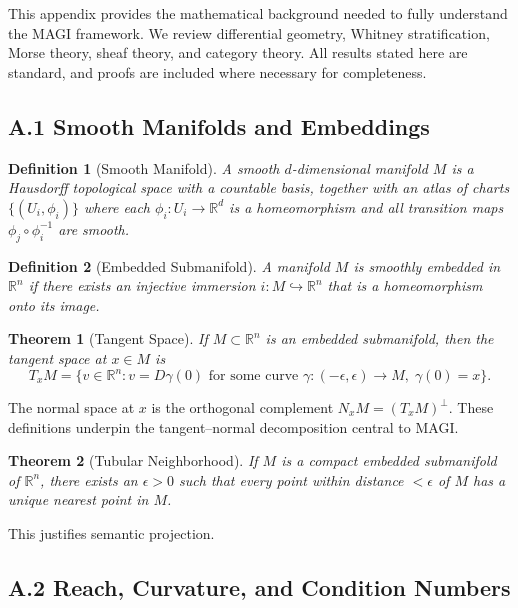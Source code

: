 \documentclass[11pt,a4paper,twocolumn]{article}
\newtheorem*{theorem*}{Theorem}
\newtheorem*{definition*}{Definition}
\begin{document}
This appendix provides the mathematical background needed to fully
understand the MAGI framework. We review differential geometry,
Whitney stratification, Morse theory, sheaf theory, and category theory.
All results stated here are standard, and proofs are included where
necessary for completeness.

\subsection*{A.1 Smooth Manifolds and Embeddings}

\begin{definition*}[Smooth Manifold]
A smooth $d$-dimensional manifold $M$ is a Hausdorff topological space
with a countable basis, together with an atlas of charts
$\{(U_i,\phi_i)\}$ where each $\phi_i : U_i \to \mathbb{R}^d$ is a
homeomorphism and all transition maps $\phi_j \circ \phi_i^{-1}$ are
smooth.
\end{definition*}

\begin{definition*}[Embedded Submanifold]
A manifold $M$ is smoothly embedded in $\mathbb{R}^n$ if there exists an
injective immersion $i : M \hookrightarrow \mathbb{R}^n$ that is a
homeomorphism onto its image.
\end{definition*}

\begin{theorem*}[Tangent Space]
If $M \subset \mathbb{R}^n$ is an embedded submanifold, then the tangent
space at $x \in M$ is
\[
T_x M = \{v \in \mathbb{R}^n : v = D\gamma(0) \text{ for some curve }
\gamma : (-\epsilon,\epsilon) \to M,\; \gamma(0)=x\}.
\]
\end{theorem*}

The normal space at $x$ is the orthogonal complement $N_x M = (T_x M)^\perp$.
These definitions underpin the tangent--normal decomposition central to MAGI.

\begin{theorem*}[Tubular Neighborhood]
If $M$ is a compact embedded submanifold of $\mathbb{R}^n$, there exists
an $\epsilon > 0$ such that every point within distance $<\epsilon$ of
$M$ has a unique nearest point in $M$.
\end{theorem*}

This justifies semantic projection.

\subsection*{A.2 Reach, Curvature, and Condition Numbers}
\end{document}
